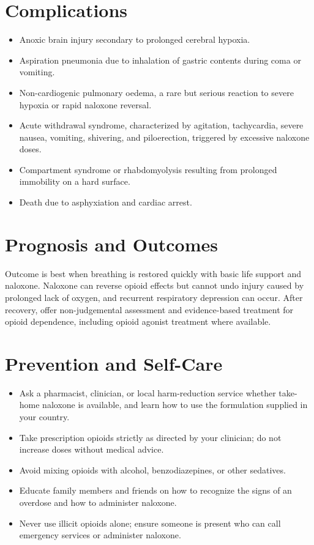 \section*{Complications}
\begin{itemize}
    \item Anoxic brain injury secondary to prolonged cerebral hypoxia.
    \item Aspiration pneumonia due to inhalation of gastric contents during coma or vomiting.
    \item Non-cardiogenic pulmonary oedema, a rare but serious reaction to severe hypoxia or rapid naloxone reversal.
    \item Acute withdrawal syndrome, characterized by agitation, tachycardia, severe nausea, vomiting, shivering, and piloerection, triggered by excessive naloxone doses.
    \item Compartment syndrome or rhabdomyolysis resulting from prolonged immobility on a hard surface.
    \item Death due to asphyxiation and cardiac arrest.
\end{itemize}

\section*{Prognosis and Outcomes}
Outcome is best when breathing is restored quickly with basic life support and naloxone. Naloxone can reverse opioid effects but cannot undo injury caused by prolonged lack of oxygen, and recurrent respiratory depression can occur. After recovery, offer non-judgemental assessment and evidence-based treatment for opioid dependence, including opioid agonist treatment where available.

\section*{Prevention and Self-Care}
\begin{itemize}
    \item Ask a pharmacist, clinician, or local harm-reduction service whether take-home naloxone is available, and learn how to use the formulation supplied in your country.
    \item Take prescription opioids strictly as directed by your clinician; do not increase doses without medical advice.
    \item Avoid mixing opioids with alcohol, benzodiazepines, or other sedatives.
    \item Educate family members and friends on how to recognize the signs of an overdose and how to administer naloxone.
    \item Never use illicit opioids alone; ensure someone is present who can call emergency services or administer naloxone.
\end{itemize}

